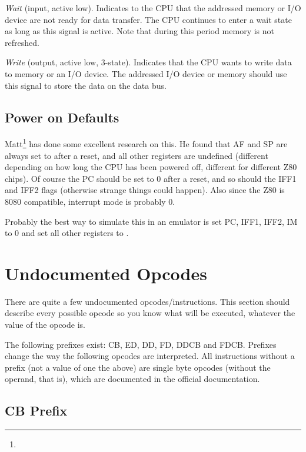 \begin{description}[leftmargin=1.5em]
    \item[$\mathtt{\overline{WAIT}}$]
    {\em Wait} (input, active low). Indicates to the CPU that the addressed memory or I/O device are not ready for data transfer. The CPU continues to enter a wait state as long as this signal is active. Note that during this period memory is not refreshed.

    \item[$\mathtt{\overline{WR}}$]
    {\em Write} (output, active low, 3-state). Indicates that the CPU wants to write data to memory or an I/O device. The addressed I/O device or memory should use this signal to store the data on the data bus.

\end{description}


\subsection{Power on Defaults}
\label{pon}

Matt\footnote{} has done some excellent research on this. He found that AF and SP are always set to  after a reset, and all other registers are undefined (different depending on how long the CPU has been powered off, different for different Z80 chips). Of course the PC should be set to 0 after a reset, and so should the IFF1 and IFF2 flags (otherwise strange things could happen). Also since the Z80 is 8080 compatible, interrupt mode is probably 0.

Probably the best way to simulate this in an emulator is set PC, IFF1, IFF2, IM to 0 and set all other registers to .


\section{Undocumented Opcodes}

There are quite a few undocumented opcodes/instructions. This section should describe every possible opcode so you know what will be executed, whatever the value of the opcode is.

The following prefixes exist: CB, ED, DD, FD, DDCB and FDCB. Prefixes change the way the following opcodes are interpreted. All instructions without a prefix (not a value of one the above) are single byte opcodes (without the operand, that is), which are documented in the official documentation.


\subsection{CB Prefix \cite{gerton}}
\label{prefix_cb}

